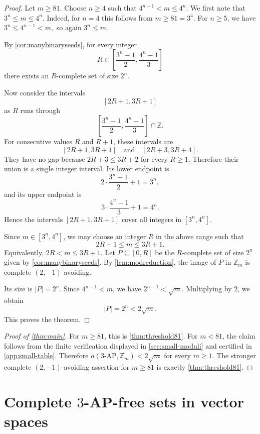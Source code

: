 \documentclass[11pt]{article}
\newcommand{\Z}{\mathbb Z}
\newcommand{\AP}{\mathrm{AP}}
\begin{document}
	\begin{proof}
		Let $m\ge81$.  Choose $n\ge4$ such that
		$ 4^{n-1}<m\le4^n.$
		We first note that
		$3^n\le m\le4^n.$
		Indeed, for $n=4$ this follows from $m\ge81=3^4$.  For $n\ge5$, we have
		$3^n\le4^{n-1}<m,$ so again $3^n\le m$.
		
		By \cref{cor:manybinaryseeds}, for every integer
		\[
		R\in
		\left[
		\frac{3^n-1}{2},
		\frac{4^n-1}{3}
		\right]
		\]
		there exists an $R$-complete set of size $2^n$.
		
		Now consider the intervals
		\[
		[2R+1,3R+1]
		\]
		as $R$ runs through
		\[
		\left[
		\frac{3^n-1}{2},
		\frac{4^n-1}{3}
		\right]\cap\Z .
		\]
		For consecutive values $R$ and $R+1$, these intervals are
		\[
		[2R+1,3R+1]
		\quad\text{and}\quad
		[2R+3,3R+4].
		\]
		They have no gap because
		$ 2R+3\le3R+2$ 
		for every $R\ge1$.  Therefore their union is a single integer interval.  Its lower endpoint is
		\[
		2\cdot\frac{3^n-1}{2}+1=3^n,
		\]
		and its upper endpoint is
		\[
		3\cdot\frac{4^n-1}{3}+1=4^n.
		\]
		Hence the intervals $[2R+1,3R+1]$ cover all integers in
		$ [3^n,4^n].$
		
		Since $m\in[3^n,4^n]$, we may choose an integer $R$ in the above range such that
		\[
		2R+1\le m\le3R+1.
		\]
		Equivalently, $2R<m\le3R+1$.  Let $P\subseteq[0,R]$ be the $R$-complete set of size $2^n$ given by \cref{cor:manybinaryseeds}.  By \cref{lem:modreduction}, the image of $P$ in $\Z_m$ is complete $(2,-1)$-avoiding.
		
		Its size is $|P|=2^n$.  Since $4^{n-1}<m$, we have $2^{n-1}<\sqrt m$.  Multiplying by $2$, we obtain
		\[
		|P|=2^n<2\sqrt m.
		\]
		This proves the theorem.
	\end{proof}
	
	\begin{proof}[Proof of \cref{thm:main}]
		For $m\ge81$, this is \cref{thm:threshold81}.  For $m<81$, the claim follows from the finite verification displayed in \cref{sec:small-moduli} and certified in \cref{app:small-table}.  Therefore $a(3\text{-}\AP,\Z_m)<2\sqrt m$ for every $m\ge1$.  The stronger complete $(2,-1)$-avoiding assertion for $m\ge81$ is exactly \cref{thm:threshold81}.
	\end{proof}
	
	
	\section{Complete $3$-AP-free sets in vector spaces} \label{sec:vector-spaces}
	
\end{document}
